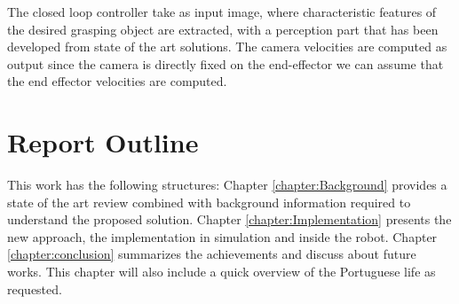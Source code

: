 The closed loop controller take as input image, where characteristic features of the desired grasping object are extracted, with a perception part that has been developed from state of the art solutions. The camera velocities are computed as output since the camera is directly fixed on the end-effector we can assume that the end effector velocities are computed. 


\section{Report Outline}

This work has the following structures: Chapter \ref{chapter:Background} provides a state of the art review combined with background information required to understand the proposed solution. Chapter \ref{chapter:Implementation} presents the new approach, the implementation in simulation and inside the robot. Chapter \ref{chapter:conclusion} summarizes the achievements and discuss about future works. This chapter will also include a quick overview of the Portuguese life as requested. 
